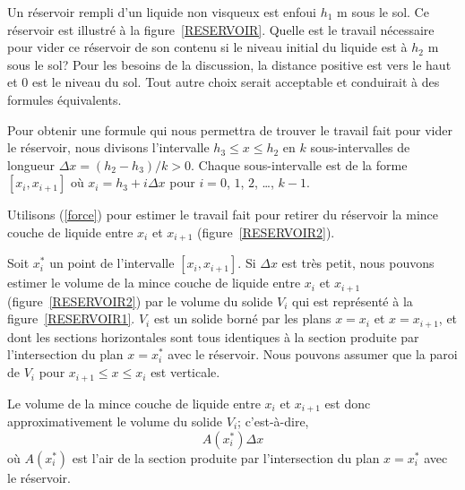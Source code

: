 {Un réservoir rempli d'un liquide non visqueux est enfoui $h_1$ m sous le sol.
Ce réservoir est illustré à la figure~\ref{RESERVOIR}. Quelle est le
travail nécessaire pour vider ce réservoir de son contenu si le niveau
initial du liquide est à $h_2$ m sous le sol?  Pour les besoins de la
discussion, la distance positive est vers le haut et $0$ est le niveau
du sol.  Tout autre choix serait acceptable et conduirait à des
formules équivalents.


Pour obtenir une formule qui nous permettra de trouver le travail fait pour
vider le réservoir, nous divisons l'intervalle $h_3 \leq x \leq h_2$ en $k$
sous-intervalles de longueur $\Delta x = (h_2-h_3)/k > 0$.  Chaque
sous-intervalle est de la forme $[x_i,x_{i+1}]$ où $x_i = h_3 + i \Delta x$
pour $i=0$, $1$, $2$, \ldots, $k-1$.

Utilisons (\ref{force}) pour estimer le travail fait pour retirer du
réservoir la mince couche de liquide entre $x_i$ et $x_{i+1}$
(figure~\ref{RESERVOIR2}).


Soit $x_i^\ast$ un point de l'intervalle $[x_i,x_{i+1}]$.  Si
$\Delta x$ est très petit, nous pouvons estimer le volume de la mince
couche de liquide entre $x_i$ et $x_{i+1}$ (figure~\ref{RESERVOIR2})
par le volume du solide $V_i$ qui est représenté à la
figure~\ref{RESERVOIR1}.  $V_i$ est un solide borné par
les plans $x=x_i$ et $x=x_{i+1}$, et dont les sections horizontales sont
tous identiques à la section produite par l'intersection du plan
$x=x_i^\ast$ avec le réservoir.  Nous pouvons assumer que la paroi de
$V_i$ pour $x_{i+1} \leq x \leq x_i$ est verticale.

Le volume de la mince couche de liquide entre $x_i$ et $x_{i+1}$ est
donc approximativement le volume du solide $V_i$; c'est-à-dire,
\begin{equation}\label{vol_couche}
A(x_i^\ast)\Delta x
\end{equation}
où $A(x_i^\ast)$ est l'air de la section produite par l'intersection
du plan $x=x_i^\ast$ avec le réservoir.


}
